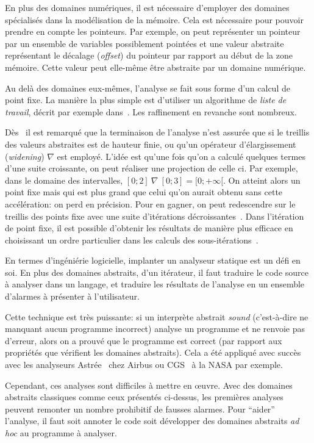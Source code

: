 En plus des domaines numériques, il est nécessaire d'employer des domaines
spécialisés dans la modélisation de la mémoire. Cela est nécessaire pour pouvoir
prendre en compte les pointeurs. Par exemple, on peut représenter un pointeur
par un ensemble de variables possiblement pointées et une valeur abstraite
représentant le décalage (\emph{offset}) du pointeur par rapport au début de la
zone mémoire. Cette valeur peut elle-même être abstraite par un domaine
numérique.

Au delà des domaines eux-mêmes, l'analyse se fait sous forme d'un calcul de
point fixe. La manière la plus simple est d'utiliser un algorithme de
\emph{liste de travail}, décrit par exemple dans~\cite{tapsoft95}. Les
raffinement en revanche sont nombreux.

Dès~\cite{Cousot77} il est remarqué que la terminaison de l'analyse n'est
assurée que si le treillis des valeurs abstraites est de hauteur finie, ou qu'un
opérateur d'élargissement (\emph{widening}) $\nabla$ est employé. L'idée est
qu'une fois qu'on a calculé quelques termes d'une suite croissante, on peut
réaliser une projection de celle ci. Par exemple, dans le domaine des
intervalles, $[0;2]~\nabla~[0;3] = [0;+\infty[$. On atteint alors un point fixe
mais qui est plus grand que celui qu'on aurait obtenu sans cette accélération:
on perd en précision. Pour en gagner, on peut redescendre sur le treillis des
points fixe avec une suite d'itérations décroissantes~\cite{granger}. Dans
l'itération de point fixe, il est possible d'obtenir les résultats de manière
plus efficace en choisissant un ordre particulier dans les calculs des
sous-itérations~\cite{policy}.

En termes d'ingéniérie logicielle, implanter un analyseur statique est un défi
en soi. En plus des domaines abstraits, d'un itérateur, il faut traduire le code
source à analyser dans un langage, et traduire les résultats de l'analyse en un
ensemble d'alarmes à présenter à l'utilisateur.

Cette technique est très puissante: si un interprète abstrait \emph{sound}
(c'est-à-dire ne manquant aucun programme incorrect) analyse un programme et ne renvoie
pas d'erreur, alors on a prouvé que le programme est correct (par rapport aux
propriétés que vérifient les domaines abstraits). Cela a été appliqué avec
succès avec les analyseurs Astrée~\cite{Astree04,Astree05,AstreeScale} chez
Airbus ou CGS~\cite{cgs} à la NASA par exemple.

Cependant, ces analyses sont difficiles à mettre en œuvre. Avec des domaines
abstraits classiques comme ceux présentés ci-dessus, les premières analyses
peuvent remonter un nombre prohibitif de fausses alarmes. Pour \enquote{aider}
l'analyse, il faut soit annoter le code soit développer des domaines abstraits
\emph{ad hoc} au programme à analyser.

